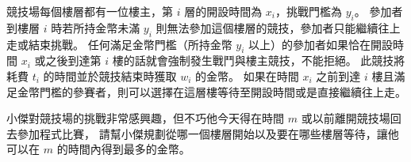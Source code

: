 競技場每個樓層都有一位樓主，第 \begin{math}i\end{math} 層的開設時間為
\begin{math}x_i\end{math}，挑戰門檻為 \begin{math}y_i\end{math}。
參加者到樓層 \begin{math}i\end{math} 時若所持金幣未滿
\begin{math}y_i\end{math}
則無法參加這個樓層的競技，參加者只能繼續往上走或結束挑戰。
任何滿足金幣門檻（所持金幣 \begin{math}y_i\end{math}
以上）的參加者如果恰在開設時間 \begin{math}x_i\end{math} 或之後到達第
\begin{math}i\end{math} 樓的話就會強制發生戰鬥與樓主競技，不能拒絕。
此競技將耗費 \begin{math}t_i\end{math} 的時間並於競技結束時獲取
\begin{math}w_i\end{math} 的金幣。 如果在時間 \begin{math}x_i\end{math}
之前到達 \begin{math}i\end{math}
樓且滿足金幣門檻的參賽者，則可以選擇在這層樓等待至開設時間或是直接繼續往上走。

小傑對競技場的挑戰非常感興趣，但不巧他今天得在時間
\begin{math}m\end{math} 或以前離開競技場回去參加程式比賽，
請幫小傑規劃從哪一個樓層開始以及要在哪些樓層等待，讓他可以在
\begin{math}m\end{math} 的時間內得到最多的金幣。

\newpage

